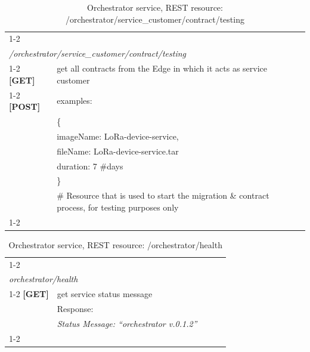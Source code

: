\begin{table}[H]
\centering
\begin{tabular}{|l|l|lll}
\cline{1-2}
\multicolumn{2}{|l|}{{\ul }}                                                                                         &  &  &  \\
\multicolumn{2}{|l|}{\textit{/orchestrator/service\_customer/contract/testing}}                                      &  &  &  \\ \cline{1-2}
\textbf{{[}GET{]}}  & get all contracts from the Edge in which it acts as service customer                           &  &  &  \\ \cline{1-2}
\textbf{{[}POST{]}} & examples:                                                                                      &  &  &  \\
                    & \{                                                                                             &  &  &  \\
                    & imageName: LoRa-device-service,                                                                &  &  &  \\
                    & fileName: LoRa-device-service.tar                                                              &  &  &  \\
                    & duration: 7 \#days                                                                             &  &  &  \\
                    & \}                                                                                             &  &  &  \\
                    & \# Resource that is used to start the migration \& contract process, for testing purposes only &  &  &  \\ \cline{1-2}
\end{tabular}
\caption{Orchestrator service, REST resource:  /orchestrator/service\_customer/contract/testing}
\end{table}%
\begin{table}[H] %
\begin{tabular}{|l|l|lll}
\cline{1-2}
\multicolumn{2}{|l|}{{\ul }}                                         &  &  &  \\
\multicolumn{2}{|l|}{\textit{orchestrator/health}}                   &  &  &  \\ \cline{1-2}
\textbf{{[}GET{]}} & get service status message                      &  &  &  \\
                   & Response:                                       &  &  &  \\
                   & \textit{Status Message: “orchestrator v.0.1.2”} &  &  &  \\ \cline{1-2}
\end{tabular}
\caption{Orchestrator service, REST resource:  /orchestrator/health}
\end{table}

